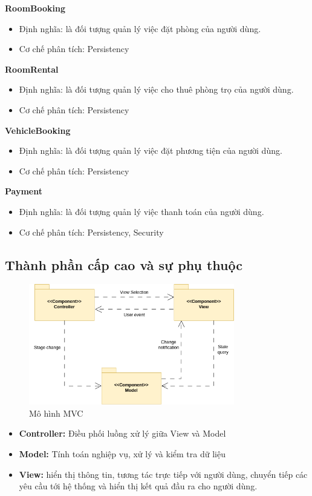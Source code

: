 \textbf{RoomBooking}
\begin{itemize}
    \item Định nghĩa: là đối tượng quản lý việc đặt phòng của người dùng.
    \item Cơ chế phân tích: Persistency
\end{itemize}

\textbf{RoomRental}
\begin{itemize}
    \item Định nghĩa: là đối tượng quản lý việc cho thuê phòng trọ của người dùng.
    \item Cơ chế phân tích: Persistency
\end{itemize}

\textbf{VehicleBooking}
\begin{itemize}
    \item Định nghĩa: là đối tượng quản lý việc đặt phương tiện của người dùng.
    \item Cơ chế phân tích: Persistency
\end{itemize}

\textbf{Payment}
\begin{itemize}
    \item Định nghĩa: là đối tượng quản lý việc thanh toán của người dùng.
    \item Cơ chế phân tích: Persistency, Security
\end{itemize}
\subsection{Thành phần cấp cao và sự phụ thuộc}
\begin{figure}[H]
    \centering
    \includegraphics[width=0.8\textwidth]{img2/MVC.drawio.png} 
    \caption{Mô hình MVC}
\end{figure}
\begin{itemize}
    \item \textbf{Controller:} 	Điều phối luồng xử lý giữa View và Model
    \item \textbf{Model:} Tính toán nghiệp vụ, xử lý và kiểm tra dữ liệu
    \item \textbf{View:} hiển thị thông tin, tương tác trực tiếp với người dùng, chuyển tiếp các yêu cầu tới hệ thống và hiển thị kết quả đầu ra cho người dùng.
\end{itemize}

